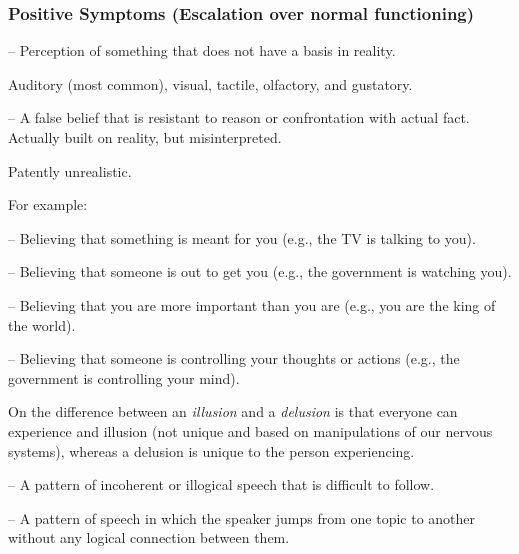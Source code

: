 \subsubsection{Positive Symptoms (Escalation over normal functioning)}

\begin{coloredlist}
    \item {} -- Perception of something that does not have a basis in reality.
    \begin{coloredlist}
        \item Auditory (most common), visual, tactile, olfactory, and gustatory.
    \end{coloredlist}
    \item {} -- A false belief that is resistant to reason or confrontation with actual fact. Actually built on reality, but misinterpreted.
    \begin{coloredlist}
        \item Patently unrealistic.
        \item For example:
        \begin{coloredlist}
            \item {} -- Believing that something is meant for you (e.g., the TV is talking to you).
            \item {} -- Believing that someone is out to get you (e.g., the government is watching you).
            \item {} -- Believing that you are more important than you are (e.g., you are the king of the world).
            \item {} -- Believing that someone is controlling your thoughts or actions (e.g., the government is controlling your mind).
        \end{coloredlist}
        \item On the difference between an \textit{illusion} and a \textit{delusion} is that everyone can experience and illusion (not unique and based on manipulations of our nervous systems), whereas a delusion is unique to the person experiencing.
    \end{coloredlist}
    \item {} -- A pattern of incoherent or illogical speech that is difficult to follow.
    \begin{coloredlist}
        \item {} -- A pattern of speech in which the speaker jumps from one topic to another without any logical connection between them.

\end{coloredlist}
\end{coloredlist}
